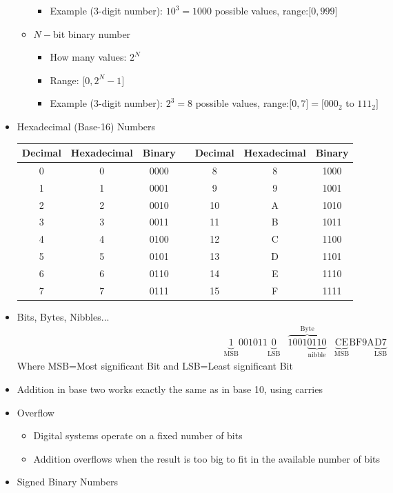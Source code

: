 \documentclass[a4paper]{article}
\begin{document}
\begin{itemize}
\begin{itemize}
\begin{itemize}
\item Example (3-digit number): $10^3=1000$ possible values, range:$\lbrack 0,999\rbrack$
\end{itemize}
\item $N-$bit binary number
\begin{itemize}
\item How many values: $2^N$
\item Range: $\lbrack 0,2^{N}-1\rbrack$
\item Example (3-digit number): $2^3=8$ possible values, range:$\lbrack 0,7\rbrack=\lbrack 000_2\text{ to }111_2\rbrack$
\end{itemize}
\end{itemize}
\item Hexadecimal (Base-16) Numbers\\
\begin{tabular}{c|c|c|c|c|c|c}
Decimal & Hexadecimal & Binary&{}&Decimal & Hexadecimal & Binary\\\hline
0&0&0000&{}&8&8&1000\\
1&1&0001&{}&9&9&1001\\
2&2&0010&{}&10&A&1010\\
3&3&0011&{}&11&B&1011\\
4&4&0100&{}&12&C&1100\\
5&5&0101&{}&13&D&1101\\
6&6&0110&{}&14&E&1110\\
7&7&0111&{}&15&F&1111\\
\end{tabular}
\item Bits, Bytes, Nibbles...
\[\begin{array}{*{20}{c}}
{\underbrace 1_{{\text{MSB}}}001011\underbrace 0_{{\text{LSB}}}}&{\overbrace {1001\underbrace {0110}_{{\text{nibble}}}}^{{\text{Byte}}}}&{\underbrace {{\text{CE}}}_{{\text{MSB}}}{\text{BF9A}}\underbrace {{\text{D7}}}_{{\text{LSB}}}}
\end{array}\]
Where MSB=Most significant Bit and LSB=Least significant Bit
\item Addition in base two works exactly the same as in base 10, using carries
\item Overflow
\begin{itemize}
\item Digital systems operate on a fixed number of bits
\item Addition overflows when the result is too big to fit in the available number of bits
\end{itemize}
\item Signed Binary Numbers

\end{itemize}
\end{document}
